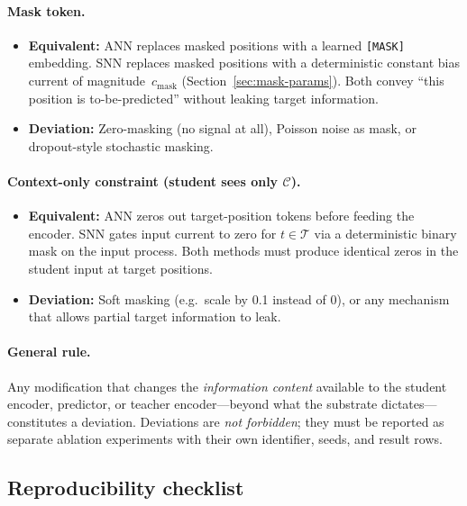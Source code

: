 \documentclass[11pt,a4paper]{article}
\newcommand{\mask}{\operatorname{mask}}    %
\begin{document}
\paragraph{Mask token.}
\begin{itemize}[nosep]
\item \textbf{Equivalent:} ANN replaces masked positions with a
  learned \texttt{[MASK]} embedding.  SNN replaces masked positions
  with a deterministic constant bias current of magnitude~$c_{\mask}$
  (Section~\ref{sec:mask-params}).  Both convey ``this position is
  to-be-predicted'' without leaking target information.
\item \textbf{Deviation:} Zero-masking (no signal at all), Poisson
  noise as mask, or dropout-style stochastic masking.
\end{itemize}

\paragraph{Context-only constraint (student sees only $\mathcal{C}$).}
\begin{itemize}[nosep]
\item \textbf{Equivalent:} ANN zeros out target-position tokens before
  feeding the encoder.  SNN gates input current to zero for
  $t \in \mathcal{T}$ via a deterministic binary mask on the input
  process.  Both methods must produce identical zeros in the student
  input at target positions.
\item \textbf{Deviation:} Soft masking (e.g.\ scale by 0.1 instead of
  0), or any mechanism that allows partial target information to leak.
\end{itemize}

\paragraph{General rule.}
Any modification that changes the \emph{information content} available to
the student encoder, predictor, or teacher encoder---beyond what the
substrate dictates---constitutes a deviation.  Deviations are \emph{not
forbidden}; they must be reported as separate ablation experiments with
their own identifier, seeds, and result rows.

\subsection{Reproducibility checklist}\label{sec:repro}
\end{document}
